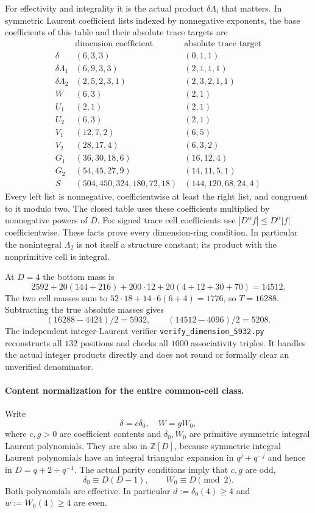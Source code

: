 For effectivity and integrality it is the actual product
$\delta\Lambda_i$ that matters. In symmetric Laurent
coefficient lists indexed by nonnegative exponents, the base
coefficients of this table and their absolute trace targets are
\[
\begin{array}{c|l|l}
 &\text{dimension coefficient}&\text{absolute trace target}\\\hline
 \delta &(6,3,3)&(0,1,1)\\
 \delta\Lambda_1&(6,9,3,3)&(2,1,1,1)\\
 \delta\Lambda_2&(2,5,2,3,1)&(2,3,2,1,1)\\
 W&(6,3)&(2,1)\\
 U_1&(2,1)&(2,1)\\
 U_2&(6,3)&(2,1)\\
 V_1&(12,7,2)&(6,5)\\
 V_2&(28,17,4)&(6,3,2)\\
 G_1&(36,30,18,6)&(16,12,4)\\
 G_2&(54,45,27,9)&(14,11,5,1)\\
 S&(504,450,324,180,72,18)&(144,120,68,24,4)
\end{array}                                                       \tag{G024.2}
\]
Every left list is nonnegative, coefficientwise at least the
right list, and congruent to it modulo two. The closed table
uses these coefficients multiplied by nonnegative powers of
$D$. For signed trace cell coefficients use
$|D^\alpha f|\le D^\alpha|f|$ coefficientwise. These facts
prove every dimension-ring condition. In particular the
nonintegral $\Lambda_2$ is not itself a structure constant;
its product with the nonprimitive cell is integral.

At $D=4$ the bottom mass is
\[
 2592+20(144+216)+200\cdot12+20(4+12+30+70)=14512.
\]
The two cell masses sum to
$52\cdot18+14\cdot6(6+4)=1776$, so $T=16288$.
Subtracting the true absolute masses gives
\[
 (16288-4424)/2=5932,\qquad (14512-4096)/2=5208.
 \tag{G024.3}
\]
The independent integer-Laurent verifier
\texttt{verify\_dimension\_5932.py} reconstructs all $132$
positions and checks all $1000$ associativity triples. It
handles the actual integer products directly and does not
round or formally clear an unverified denominator.

\paragraph{Content normalization for the entire common-cell class.}
Write
\[
 \delta=c\delta_0,\quad W=gW_0,
\]
where $c,g>0$ are coefficient contents and $\delta_0,W_0$
are primitive symmetric integral Laurent polynomials.
They are also in $\mathbb Z[D]$, because symmetric integral
Laurent polynomials have an integral triangular expansion
in $q^j+q^{-j}$ and hence in $D=q+2+q^{-1}$.
The actual parity conditions imply that $c,g$ are odd,
\[
 \delta_0\equiv D(D-1),\qquad W_0\equiv D\pmod2.
\]
Both polynomials are effective. In particular
$d:=\delta_0(4)\ge4$ and $w:=W_0(4)\ge4$ are even.

